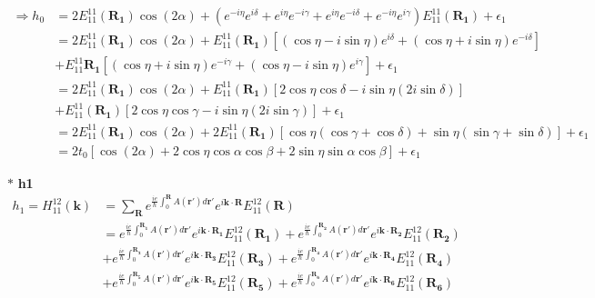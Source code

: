 \documentclass{report}
\begin{document}
\begin{align*}
	\Rightarrow h_0 & = 2 E_{11}^{11}(\mathbf{R_1}) \cos (2\alpha) + (e^{-i\eta}e^{i\delta} + e^{i\eta}e^{-i\gamma} + e^{i\eta}e^{-i\delta} + e^{-i\eta}e^{i\gamma} ) E_{11}^{11}(\mathbf{R_1}) +\epsilon_1 \\
	                & = 2 E_{11}^{11}(\mathbf{R_1}) \cos (2\alpha) + E_{11}^{11}(\mathbf{R_1}) \left[(\cos\eta - i\sin\eta ) e^{i\delta} + (\cos\eta + i\sin\eta )e^{-i\delta} \right]                      \\
	                & + E_{11}^{11}\mathbf{R_1} \left[(\cos\eta + i \sin\eta)e^{-i\gamma} + (\cos\eta - i \sin\eta)e^{i\gamma}\right] +  \epsilon_1                                                         \\
	                & = 2 E_{11}^{11}(\mathbf{R_1}) \cos (2\alpha) + E_{11}^{11}(\mathbf{R_1}) \left[2\cos\eta \cos\delta - i\sin\eta( 2i\sin\delta)  \right]                                               \\
	                & + E_{11}^{11}(\mathbf{R_1}) \left[2\cos\eta \cos\gamma - i\sin\eta( 2i\sin\gamma)  \right] +   \epsilon_1                                                                             \\
	                & = 2 E_{11}^{11}(\mathbf{R_1}) \cos (2\alpha) + 2E_{11}^{11}(\mathbf{R_1}) \left[\cos\eta (\cos\gamma + \cos\delta) + \sin\eta(\sin\gamma + \sin\delta)\right] +   \epsilon_1          \\
	                & = 2 t_0 \left[ \cos (2\alpha) + 2\cos\eta \cos\alpha\cos\beta + 2\sin\eta\sin\alpha\cos\beta\right] +   \epsilon_1
\end{align*}

\noindent $\ast$ \textbf{h1}
\begin{align*}
	h_1 = H_{11}^{12}(\textbf{k}) & = \sum_{\textbf{R}} e^{\frac{ie}{\hbar}\int_{0}^{\mathbf{R}}A(\mathbf{r'})d\mathbf{r'}}e^{i\mathbf{k\cdot R}} E_{11}^{12}(\mathbf{R})                                                                                                               \\
	                              & = e^{\frac{ie}{\hbar}\int_{0}^{\mathbf{R_1}}A(\mathbf{r'})d\mathbf{r'}}e^{i\mathbf{k\cdot R_1}} E_{11}^{12}(\mathbf{R_1}) + e^{\frac{ie}{\hbar}\int_{0}^{\mathbf{R_2}}A(\mathbf{r'})d\mathbf{r'}}e^{i\mathbf{k\cdot R_2}} E_{11}^{12}(\mathbf{R_2}) \\
	                              & + e^{\frac{ie}{\hbar}\int_{0}^{\mathbf{R_3}}A(\mathbf{r'})d\mathbf{r'}}e^{i\mathbf{k\cdot R_3}} E_{11}^{12}(\mathbf{R_3}) + e^{\frac{ie}{\hbar}\int_{0}^{\mathbf{R_4}}A(\mathbf{r'})d\mathbf{r'}}e^{i\mathbf{k\cdot R_4}} E_{11}^{12}(\mathbf{R_4}) \\
	                              & + e^{\frac{ie}{\hbar}\int_{0}^{\mathbf{R_5}}A(\mathbf{r'})d\mathbf{r'}}e^{i\mathbf{k\cdot R_5}} E_{11}^{12}(\mathbf{R_5}) + e^{\frac{ie}{\hbar}\int_{0}^{\mathbf{R_6}}A(\mathbf{r'})d\mathbf{r'}}e^{i\mathbf{k\cdot R_6}} E_{11}^{12}(\mathbf{R_6})
\end{align*}
\end{document}
